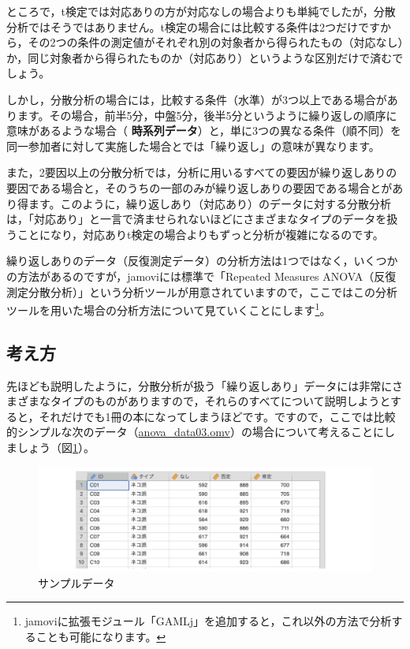 \documentclass[
  12pt,
  a5jpaper,
  lualatex, ja=standard]{bxjsbook}
\renewcommand{\emph}[1]{\textbf{\color{emph} #1}}
\begin{document}
ところで，t検定では対応ありの方が対応なしの場合よりも単純でしたが，分散分析ではそうではありません。t検定の場合には比較する条件は2つだけですから，その2つの条件の測定値がそれぞれ別の対象者から得られたもの（対応なし）か，同じ対象者から得られたものか（対応あり）というような区別だけで済むでしょう。

しかし，分散分析の場合には，比較する条件（水準）が3つ以上である場合があります。その場合，前半5分，中盤5分，後半5分というように繰り返しの順序に意味があるような場合（\emph{時系列データ}）と，単に3つの異なる条件（順不同）を同一参加者に対して実施した場合とでは「繰り返し」の意味が異なります。

また，2要因以上の分散分析では，分析に用いるすべての要因が繰り返しありの要因である場合と，そのうちの一部のみが繰り返しありの要因である場合とがあり得ます。このように，繰り返しあり（対応あり）のデータに対する分散分析は，「対応あり」と一言で済ませられないほどにさまざまなタイプのデータを扱うことになり，対応ありt検定の場合よりもずっと分析が複雑になるのです。

繰り返しありのデータ（反復測定データ）の分析方法は1つではなく，いくつかの方法があるのですが，jamoviには標準で「Repeated Measures ANOVA（反復測定分散分析）」という分析ツールが用意されていますので，ここではこの分析ツールを用いた場合の分析方法について見ていくことにします\footnote{jamoviに拡張モジュール「GAMLj」を追加すると，これ以外の方法で分析することも可能になります。}。

\hypertarget{sub:ANOVA-rm-basics}{%
\subsection{考え方}\label{sub:ANOVA-rm-basics}}

先ほども説明したように，分散分析が扱う「繰り返しあり」データには非常にさまざまなタイプのものがありますので，それらのすべてについて説明しようとすると，それだけでも1冊の本になってしまうほどです。ですので，ここでは比較的シンプルな次のデータ（\href{https://github.com/sbtseiji/jmv_compguide/raw/main/data/omv/anova_data03.omv}{anova\_data03.omv}）の場合について考えることにしましょう（図\ref{fig:ANOVA-data03}）。

\begin{figure}[!ht]

{\centering \includegraphics[width=1\linewidth]{images/ANOVA/data03} 

}

\caption{サンプルデータ}\label{fig:ANOVA-data03}
\end{figure}
\end{document}
